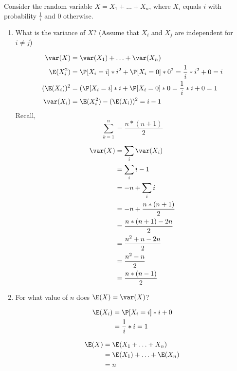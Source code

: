 \question Consider the random variable $X = X_1 + \dotsc + X_n$, 
where $X_i$ equals $i$ with probability $\frac{1}{i}$ and 0 otherwise. 
\begin{enumerate}[label=(\alph*)]
\item What is the variance of $X$? (Assume that $X_i$ and $X_j$ are 
independent for $i \neq j$)
\begin{solution}[4cm]
\begin{equation}
\begin{split}
\var(X) &= \var(X_1) + \dotsc + \var(X_n) \\ \nonumber
\E(X_i^2) &= \P[X_i = i]*i^2 +\P[X_i = 0]*0^2 = \frac{1}{i}*i^2 + 0 = i \\
(\E(X_i))^2 &= (\P[X_i = i]*i + \P[X_i = 0]*0 = \frac{1}{i}*i + 0 = 1 \\
\var(X_i) &= \E(X_i^2) - (\E(X_i))^2 = i - 1
\end{split}
\end{equation}
Recall, 
\[\sum_{k = 1}^{n} = \frac{n*(n + 1)}{2}\]

\begin{equation}
\begin{split}
\var(X) &= \sum_i \var(X_i) \\ \nonumber
&= \sum_i i - 1 \\
&= -n + \sum_i i \\
&= -n + \frac{n * (n + 1)}{2} \\
&= \frac{n*(n + 1) - 2n}{2} \\
&= \frac{n^2 + n - 2n}{2} \\
&= \frac{n^2 - n}{2} \\
&= \frac{n*(n - 1)}{2}
\end{split}
\end{equation}
\end{solution}

\item For what value of $n$ does $\E(X) = \var(X)$?
\begin{solution}[3cm]
\begin{equation}
\begin{split}
\E(X_i) &= \P[X_i = i]*i + 0 \\ \nonumber
&= \frac{1}{i}*i = 1
\end{split}
\end{equation}


\begin{equation}
\begin{split}
\E(X) &= \E(X_1 + \dotsc + X_n) \\ \nonumber
&= \E(X_1) + \dotsc + \E(X_n) \\
&= n
\end{split}
\end{equation}



\end{solution}
\end{enumerate}
